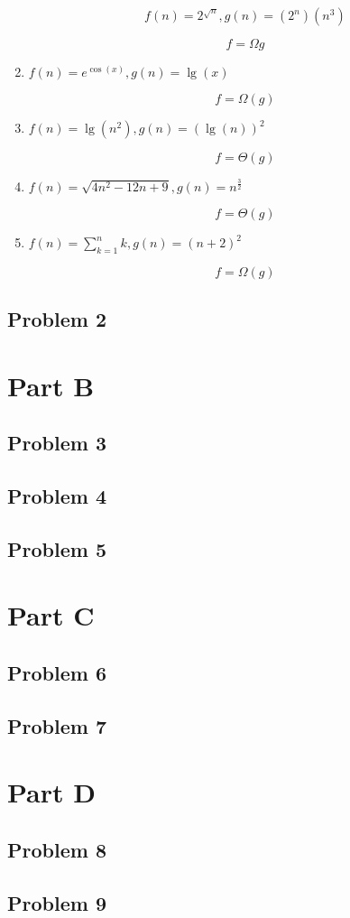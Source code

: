 \documentclass[11pt]{article}
\begin{document}
\begin{enumerate}
\[ f(n) = 2^{\sqrt{n}}, g(n) = (2^n) (n^3) \]

\[f = \Omega{g}\]

\item $f(n) = e^{\cos(x)}, g(n) = \lg(x)$

\[ f = \Omega(g) \]

\item $ f(n) = \lg(n^2), g(n) = (\lg(n))^2 $

\[ f = \Theta(g) \]

\item $ f(n) = \sqrt{4n^2 - 12n + 9}, g(n) = n^{\frac{3}{2}} $

\[ f = \Theta(g) \]

\item $ f(n) = \sum_{k = 1}^{n} k, g(n) = (n + 2)^2 $

\[ f = \Omega(g) \]

\end{enumerate}

\subsection*{Problem 2}

\section*{Part B}

\subsection*{Problem 3}

\subsection*{Problem 4}

\subsection*{Problem 5}

\section*{Part C}

\subsection*{Problem 6}

\subsection*{Problem 7}

\section*{Part D}

\subsection*{Problem 8}

\subsection*{Problem 9}
\end{document}
